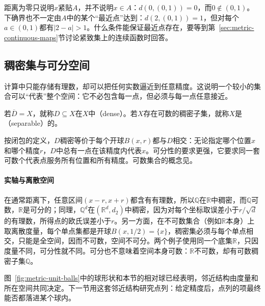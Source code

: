 距离为零只说明$x$紧贴$A$，并不说明$x\in A$：$d(0,(0,1))=0$，而$0\notin(0,1)$。下确界也不一定由$A$中的某个“最近点”达到：$d(2,(0,1))=1$，但对每个$a\in(0,1)$都有$|2-a|>1$。什么条件能保证最近点存在，要等到第~\ref{sec:metric-continuous-maps}节讨论紧致集上的连续函数时回答。

\subsection{稠密集与可分空间}
\label{sec:metric-separable}

计算中只能存储有理数，却可以把任何实数逼近到任意精度。这说明一个较小的集合可以“代表”整个空间：它不必包含每一点，但必须与每一点任意接近。

\begin{definition}[稠密集与可分空间]
\label{def:metric-separable}
若$\overline D=X$，就称$D\subseteq X$在$X$中（dense）。若$X$存在可数的稠密子集，就称$X$是（separable）的。
\end{definition}

按闭包的定义，$D$稠密等价于每个开球$B(x,r)$都与$D$相交：无论指定哪个位置$x$和哪个精度$r$，$D$中总有一点在该精度内代表$x$。可分性的要求更强，它要求同一套可数个代表点服务所有位置和所有精度。可数集合的概念见。

\paragraph{实轴与离散空间}
在通常距离下，任意区间$(x-r,x+r)$都含有有理数，所以$\mathbb Q$在$\mathbb R$中稠密，而$\mathbb Q$可数，$\mathbb R$是可分的；同理，$\mathbb Q^d$在$(\mathbb R^d,d_2)$中稠密，因为对每个坐标取误差小于$r/\sqrt d$的有理数，所得点的欧氏误差小于$r$。另一方面，在不可数集合（例如$\mathbb R$本身）上取离散度量，每个单点集都是开球$B(x,1/2)=\{x\}$，稠密集必须与每个单点相交，只能是全空间，因而不可数，空间不可分。两个例子使用同一个底集$\mathbb R$，只因度量不同，可分性就不同。可分也不意味着空间本身可数：$\mathbb R$不可数，却有可数稠密子集$\mathbb Q$。

图~\ref{fig:metric-unit-balls}中的球形状和本节的相对球已经表明，邻近结构由度量和所在空间共同决定。下一节用这套邻近结构研究点列：给定精度后，点列的项最终能否都落进某个球内。
